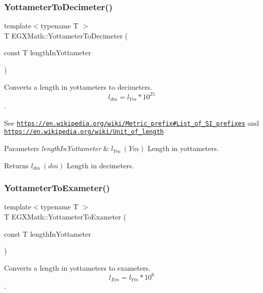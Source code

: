 \subsubsection{\texorpdfstring{Yottameter\+To\+Decimeter()}{YottameterToDecimeter()}}
{\footnotesize\ttfamily template$<$typename T $>$ \\
T E\+G\+X\+Math\+::\+Yottameter\+To\+Decimeter (\begin{DoxyParamCaption}\item[{const T}]{length\+In\+Yottameter }\end{DoxyParamCaption})}



Converts a length in yottameters to decimeters. \[ l_{dm}=l_{Ym} * 10^{25} \]. 

See \href{https://en.wikipedia.org/wiki/Metric_prefix#List_of_SI_prefixes}{\tt https\+://en.\+wikipedia.\+org/wiki/\+Metric\+\_\+prefix\#\+List\+\_\+of\+\_\+\+S\+I\+\_\+prefixes} and \href{https://en.wikipedia.org/wiki/Unit_of_length}{\tt https\+://en.\+wikipedia.\+org/wiki/\+Unit\+\_\+of\+\_\+length} 
\begin{DoxyParams}{Parameters}
{\em length\+In\+Yottameter} & $ l_{Ym}\ (Ym)$ Length in yottameters. \\
\hline
\end{DoxyParams}
\begin{DoxyReturn}{Returns}
$ l_{dm}\ (dm)$ Length in decimeters. 
\end{DoxyReturn}
\mbox{\label{group___e_g_x_math-_conversions-_length_conversions-_s_i-_yottameter-_s_i_ga596bb0befe41a04cc5e193786ccc8de7}} 
\subsubsection{\texorpdfstring{Yottameter\+To\+Exameter()}{YottameterToExameter()}}
{\footnotesize\ttfamily template$<$typename T $>$ \\
T E\+G\+X\+Math\+::\+Yottameter\+To\+Exameter (\begin{DoxyParamCaption}\item[{const T}]{length\+In\+Yottameter }\end{DoxyParamCaption})}



Converts a length in yottameters to exameters. \[ l_{Em}=l_{Ym} * 10^{6} \]. 

